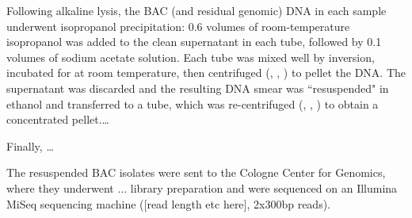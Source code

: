 Following alkaline lysis, the BAC (and residual genomic) DNA in each sample underwent isopropanol precipitation: 0.6 volumes of room-temperature isopropanol was added to the clean supernatant in each tube, followed by 0.1 volumes of  sodium acetate solution. Each tube was mixed well by inversion, incubated for  at room temperature, then centrifuged (, , ) to pellet the DNA. The supernatant was discarded and the resulting DNA smear was ``resuspended" in   ethanol and transferred to a  tube, which was re-centrifuged (, , ) to obtain a concentrated pellet.\dots %

Finally, \dots %


The resuspended BAC isolates were sent to the Cologne Center for Genomics, where they underwent ... library preparation and were sequenced on an Illumina MiSeq sequencing machine ([read length etc here], 2x300bp reads). %

